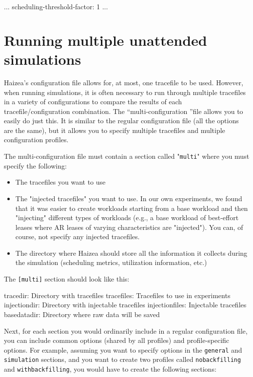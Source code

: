 \begin{wideshellverbatim}
[scheduling]
...
scheduling-threshold-factor: 1
...
\end{wideshellverbatim}

\section{Running multiple unattended simulations}
\label{sec:multiplesim}
Haizea's configuration file allows for, at most, one tracefile to be used. However, when running simulations, it is often necessary to run through multiple tracefiles in a variety of configurations to compare the results of each tracefile/configuration combination. The ``multi-configuration ''file allows you to easily do just this. It is similar to the regular configuration file (all the options are the same), but it allows you to specify multiple tracefiles and multiple configuration profiles.

The multi-configuration file must contain a section called "\texttt{multi}" where you must specify the following:

\begin{itemize}
\item The tracefiles you want to use
\item The "injected tracefiles" you want to use. In our own experiments, we found that it was easier to create workloads starting from a base workload and then "injecting" different types of workloads (e.g., a base workload of best-effort leases where AR leases of varying characteristics are "injected"). You can, of course, not specify any injected tracefiles.
\item The directory where Haizea should store all the information it collects during the simulation (scheduling metrics, utilization information, etc.)
\end{itemize}

The \texttt{[multi]} section should look like this:

\begin{wideshellverbatim}
[multi]
tracedir: Directory with tracefiles
tracefiles: Tracefiles to use in experiments
injectiondir: Directory with injectable tracefiles
injectionfiles: Injectable tracefiles
basedatadir: Directory where raw data will be saved
\end{wideshellverbatim}

Next, for each section you would ordinarily include in a regular configuration file, you can include common options (shared by all profiles) and profile-specific options. For example, assuming you want to specify options in the \texttt{general} and \texttt{simulation} sections, and you want to create two profiles called \texttt{nobackfilling} and \texttt{withbackfilling}, you would have to create the following sections:

